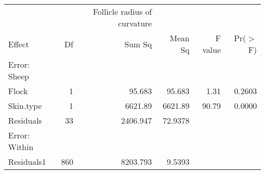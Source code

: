 \begin{table}[ht]
\begin{tabular}{lrrrrr}
 & & Follicle radius of curvature & & & \\
 Effect & Df & Sum Sq & Mean Sq & F value & Pr($>$F) \\ 
  \hline
  Error: Sheep & & & &  & \\
Flock     & 1 & 95.683 & 95.683 & 1.31 & 0.2603 \\ 
  Skin.type & 1 & 6621.89 & 6621.89 & 90.79 & 0.0000 \\ 
  Residuals & 33 & 2406.947 & 72.9378 &  &  \\ 
  Error: Within & & & & &  \\
  Residuals1 & 860 & 8203.793 & 9.5393 &  &  \\ 
   \hline
\end{tabular}
\end{table}
